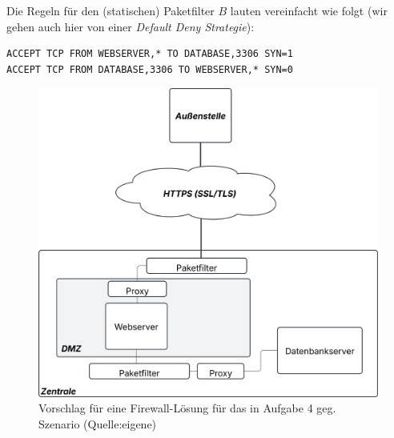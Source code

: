 \noindent
Die Regeln für den (statischen) Paketfilter $B$ lauten vereinfacht wie folgt (wir gehen auch hier von einer \textit{Default Deny Strategie}):

\begin{verbatim}
ACCEPT TCP FROM WEBSERVER,* TO DATABASE,3306 SYN=1
ACCEPT TCP FROM DATABASE,3306 TO WEBSERVER,* SYN=0
\end{verbatim}


\begin{figure}
    \centering
    \includegraphics[scale=0.4]{aufgabe 5/img/firewall.svg}
    \caption{Vorschlag für eine Firewall-Lösung für das in Aufgabe 4 geg. Szenario (Quelle:eigene)}
    \label{fig:firewall}
\end{figure}
